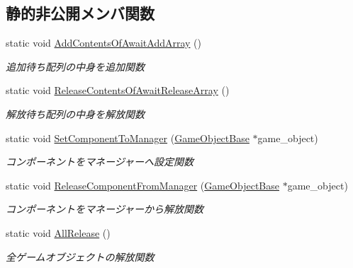 \subsection*{静的非公開メンバ関数}
\begin{DoxyCompactItemize}
\item 
static void \mbox{\hyperlink{class_game_object_manager_a783a9d55d566ab8c39e6ed86b3b52a09}{Add\+Contents\+Of\+Await\+Add\+Array}} ()
\begin{DoxyCompactList}\small\item\em 追加待ち配列の中身を追加関数 \end{DoxyCompactList}\item 
static void \mbox{\hyperlink{class_game_object_manager_a5a6c1208229decd93c6ef396bce35b3a}{Release\+Contents\+Of\+Await\+Release\+Array}} ()
\begin{DoxyCompactList}\small\item\em 解放待ち配列の中身を解放関数 \end{DoxyCompactList}\item 
static void \mbox{\hyperlink{class_game_object_manager_a4c6cdb6d0a1f43a2e2e705677fa2f5f6}{Set\+Component\+To\+Manager}} (\mbox{\hyperlink{class_game_object_base}{Game\+Object\+Base}} $\ast$game\+\_\+object)
\begin{DoxyCompactList}\small\item\em コンポーネントをマネージャーへ設定関数 \end{DoxyCompactList}\item 
static void \mbox{\hyperlink{class_game_object_manager_a3435fd94a3a7b9eb69f422e33848137a}{Release\+Component\+From\+Manager}} (\mbox{\hyperlink{class_game_object_base}{Game\+Object\+Base}} $\ast$game\+\_\+object)
\begin{DoxyCompactList}\small\item\em コンポーネントをマネージャーから解放関数 \end{DoxyCompactList}\item 
static void \mbox{\hyperlink{class_game_object_manager_a58e1266da3b18a4c0bded551e386c6ae}{All\+Release}} ()
\begin{DoxyCompactList}\small\item\em 全ゲームオブジェクトの解放関数 \end{DoxyCompactList}\end{DoxyCompactItemize}
